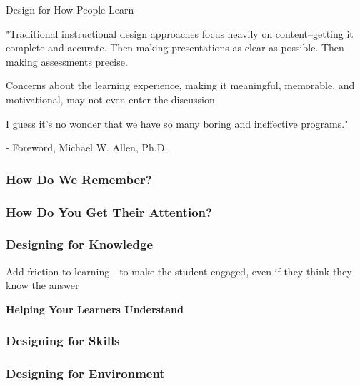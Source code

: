 Design for How People Learn

"Traditional instructional design approaches focus heavily on content–getting it complete and accurate. Then making presentations as clear as possible. Then making assessments precise. 

Concerns about the learning experience, making it meaningful, memorable, and motivational, may not even enter the discussion.

I guess it's no wonder that we have so many boring and ineffective programs."

- Foreword, Michael W. Allen, Ph.D.

\subsubsection{How Do We Remember?}

\subsubsection{How Do You Get Their Attention?}

\subsubsection{Designing for Knowledge}
Add friction to learning
- to make the student engaged, even if they think they know the answer

\textbf{Helping Your Learners Understand}



\subsubsection{Designing for Skills}


\subsubsection{Designing for Environment}

